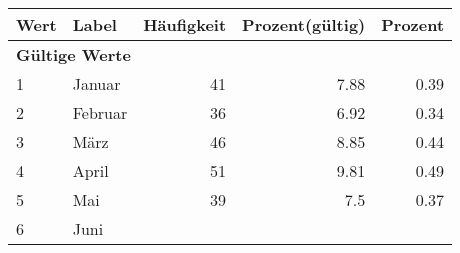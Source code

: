      \begin{longtable}{lXrrr}
     \toprule
     \textbf{Wert} & \textbf{Label} & \textbf{Häufigkeit} & \textbf{Prozent(gültig)} & \textbf{Prozent} \\
     \endhead
     \midrule
     \multicolumn{5}{l}{\textbf{Gültige Werte}}\\

     1 &
     \multicolumn{1}{X}{ Januar   } &


       \num{41} &
       \num[round-mode=places,round-precision=2]{7.88} &
         \num[round-mode=places,round-precision=2]{0.39} \\

     2 &
     \multicolumn{1}{X}{ Februar   } &


       \num{36} &
       \num[round-mode=places,round-precision=2]{6.92} &
         \num[round-mode=places,round-precision=2]{0.34} \\

     3 &
     \multicolumn{1}{X}{ März   } &


       \num{46} &
       \num[round-mode=places,round-precision=2]{8.85} &
         \num[round-mode=places,round-precision=2]{0.44} \\

     4 &
     \multicolumn{1}{X}{ April   } &


       \num{51} &
       \num[round-mode=places,round-precision=2]{9.81} &
         \num[round-mode=places,round-precision=2]{0.49} \\

     5 &
     \multicolumn{1}{X}{ Mai   } &


       \num{39} &
       \num[round-mode=places,round-precision=2]{7.5} &
         \num[round-mode=places,round-precision=2]{0.37} \\

     6 &
     \multicolumn{1}{X}{ Juni   } &



\end{longtable}
